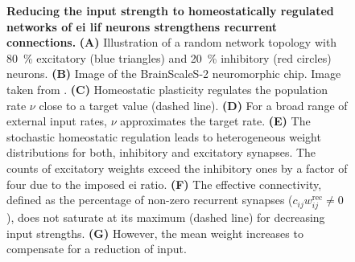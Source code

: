 
\begin{figure}[ht]
	\centering

	\caption{%
		\textbf{Reducing the input strength to homeostatically regulated networks of \gls{ei} \gls{lif} neurons strengthens recurrent connections.}
		\textbf{(A)} Illustration of a random network topology with \SI{80}{\percent} excitatory (blue triangles) and \SI{20}{\percent} inhibitory (red circles) neurons.
		\textbf{(B)} Image of the BrainScaleS-2 neuromorphic chip.
		Image taken from \citep{muller_extending_2020}.
		\textbf{(C)} Homeostatic plasticity regulates the population rate $\nu$ close to a target value (dashed line).
		\textbf{(D)} For a broad range of external input rates, $\nu$ approximates the target rate.
		\textbf{(E)} The stochastic homeostatic regulation leads to heterogeneous weight distributions for both, inhibitory and excitatory synapses.
		The counts of excitatory weights exceed the inhibitory ones by a factor of four due to the imposed \gls{ei} ratio.
            \textbf{(F)} The effective connectivity, defined as the percentage of non-zero recurrent synapses ($c_{ij}w^\mathrm{rec}_{ij}\neq 0$), does not saturate at its maximum (dashed line) for decreasing input strengths.
		\textbf{(G)} However, the mean weight increases to compensate for a reduction of input.
	}
	\label{fig:chip}
\end{figure}

